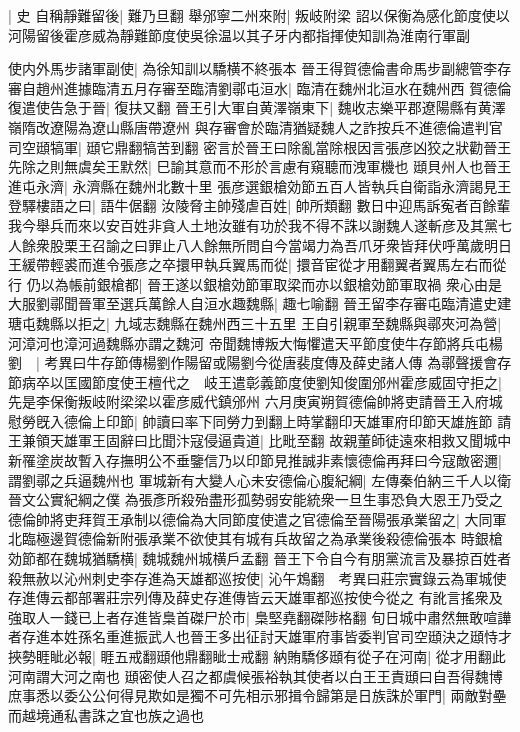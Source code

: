 |{
	史}
自稱靜難留後|{
	難乃旦翻}
舉邠寧二州來附|{
	叛岐附梁}
詔以保衡為感化節度使以河陽留後霍彦威為靜難節度使吳徐温以其子牙内都指揮使知訓為淮南行軍副

使内外馬步諸軍副使|{
	為徐知訓以驕横不終張本}
晉王得賀德倫書命馬步副總管李存審自趙州進據臨清五月存審至臨清劉鄩屯洹水|{
	臨清在魏州北洹水在魏州西}
賀德倫復遣使告急于晉|{
	復扶又翻}
晉王引大軍自黄澤嶺東下|{
	魏收志樂平郡遼陽縣有黄澤嶺隋改遼陽為遼山縣唐帶遼州}
與存審會於臨清猶疑魏人之詐按兵不進德倫遣判官司空頲犒軍|{
	頲它鼎翻犒苦到翻}
密言於晉王曰除亂當除根因言張彦凶狡之狀勸晉王先除之則無虞矣王默然|{
	巳諭其意而不形於言慮有窺聽而洩軍機也}
頲貝州人也晉王進屯永濟|{
	永濟縣在魏州北數十里}
張彦選銀槍効節五百人皆執兵自衛詣永濟謁見王登驛樓語之曰|{
	語牛倨翻}
汝陵脅主帥殘虐百姓|{
	帥所類翻}
數日中迎馬訴寃者百餘輩我今舉兵而來以安百姓非貪人土地汝雖有功於我不得不誅以謝魏人遂斬彦及其黨七人餘衆股栗王召諭之曰罪止八人餘無所問自今當竭力為吾爪牙衆皆拜伏呼萬歲明日王緩帶輕裘而進令張彦之卒擐甲執兵翼馬而從|{
	擐音宦從才用翻翼者翼馬左右而從行}
仍以為帳前銀槍都|{
	晉王遂以銀槍効節軍取梁而亦以銀槍効節軍取禍}
衆心由是大服劉鄩聞晉軍至選兵萬餘人自洹水趣魏縣|{
	趣七喻翻}
晉王留李存審屯臨清遣史建瑭屯魏縣以拒之|{
	九域志魏縣在魏州西三十五里}
王自引親軍至魏縣與鄩夾河為營|{
	河漳河也漳河過魏縣亦謂之魏河}
帝聞魏博叛大悔懼遣天平節度使牛存節將兵屯楊劉　|{
	考異曰牛存節傳楊劉作陽留或陽劉今從唐裴度傳及薛史諸人傳}
為鄩聲援會存節病卒以匡國節度使王檀代之　岐王遣彰義節度使劉知俊圍邠州霍彦威固守拒之|{
	先是李保衡叛岐附梁梁以霍彦威代鎮邠州}
六月庚寅朔賀德倫帥將吏請晉王入府城慰勞旣入德倫上印節|{
	帥讀曰率下同勞力到翻上時掌翻印天雄軍府印節天雄旌節}
請王兼領天雄軍王固辭曰比聞汴寇侵逼貴道|{
	比毗至翻}
故親董師徒遠來相救又聞城中新罹塗炭故暫入存撫明公不垂鑒信乃以印節見推誠非素懷德倫再拜曰今寇敵密邇|{
	謂劉鄩之兵逼魏州也}
軍城新有大變人心未安德倫心腹紀綱|{
	左傳秦伯納三千人以衛晉文公實紀綱之僕}
為張彥所殺殆盡形孤勢弱安能統衆一旦生事恐負大恩王乃受之德倫帥將吏拜賀王承制以德倫為大同節度使遣之官德倫至晉陽張承業留之|{
	大同軍北臨極邊賀德倫新附張承業不欲使其有城有兵故留之為承業後殺德倫張本}
時銀槍効節都在魏城猶驕横|{
	魏城魏州城横戶孟翻}
晉王下令自今有朋黨流言及暴掠百姓者殺無赦以沁州刺史李存進為天雄都巡按使|{
	沁午鴆翻　考異曰莊宗實錄云為軍城使存進傳云都部署莊宗列傳及薛史存進傳皆云天雄軍都巡按使今從之}
有訛言搖衆及強取人一錢已上者存進皆梟首磔尸於市|{
	梟堅堯翻磔陟格翻}
旬日城中肅然無敢喧譁者存進本姓孫名重進振武人也晉王多出征討天雄軍府事皆委判官司空頲決之頲恃才挾勢睚眦必報|{
	睚五戒翻頲他鼎翻眦士戒翻}
納賄驕侈頲有從子在河南|{
	從才用翻此河南謂大河之南也}
頲密使人召之都虞候張裕執其使者以白王王責頲曰自吾得魏博庶事悉以委公公何得見欺如是獨不可先相示邪揖令歸第是日族誅於軍門|{
	兩敵對壘而越境通私書誅之宜也族之過也}
